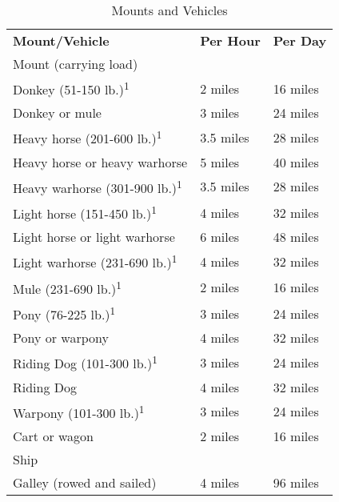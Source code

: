 \begin{table}[htb]
\caption{Mounts and Vehicles}
\centering
\begin{tabular}{l l l}
\textbf{Mount/Vehicle} & \textbf{Per Hour} & \textbf{Per Day}\\
Mount (carrying load) & & \\
\hspace{1cm}Donkey (51-150 lb.)\textsuperscript{1} & 2 miles & 16 miles\\
\hspace{1cm}Donkey or mule & 3 miles & 24 miles\\
\hspace{1cm}Heavy horse (201-600 lb.)\textsuperscript{1} & 3.5 miles & 28 miles\\
\hspace{1cm}Heavy horse or heavy warhorse & 5 miles & 40 miles\\
\hspace{1cm}Heavy warhorse (301-900 lb.)\textsuperscript{1} & 3.5 miles & 28 miles\\
\hspace{1cm}Light horse (151-450 lb.)\textsuperscript{1} & 4 miles & 32 miles\\
\hspace{1cm}Light horse or light warhorse & 6 miles & 48 miles\\
\hspace{1cm}Light warhorse (231-690 lb.)\textsuperscript{1} & 4 miles & 32 miles\\
\hspace{1cm}Mule (231-690 lb.)\textsuperscript{1} & 2 miles & 16 miles\\
\hspace{1cm}Pony (76-225 lb.)\textsuperscript{1} & 3 miles & 24 miles\\
\hspace{1cm}Pony or warpony & 4 miles & 32 miles\\
\hspace{1cm}Riding Dog (101-300 lb.)\textsuperscript{1} & 3 miles & 24 miles\\
\hspace{1cm}Riding Dog & 4 miles & 32 miles\\
\hspace{1cm}Warpony (101-300 lb.)\textsuperscript{1} & 3 miles & 24 miles\\
Cart or wagon & 2 miles & 16 miles\\
Ship & & \\
\hspace{1cm}Galley (rowed and sailed) & 4 miles & 96 miles\\

\end{tabular}
\end{table}
